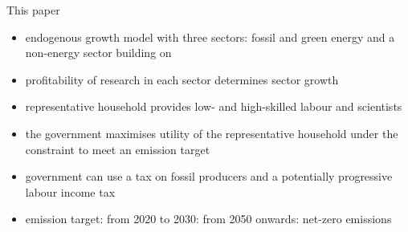 \documentclass[11pt,aspectratio=169]{beamer}
\newcommand{\ar}{$\Rightarrow$ \ }
\begin{document}

\begin{frame}{This paper}
\begin{itemize}
	\item<+-> endogenous growth model with three sectors: fossil and green energy and a non-energy sector building on \cite{Fried2018ClimateAnalysis}
	\item<+-> profitability of research in each sector determines sector growth
	\item<+-> representative household provides low- and high-skilled labour and scientists
	\item<+-> the government maximises utility of the representative household under the constraint to meet an emission target
	\item<+-> government can use a tax on fossil producers and a potentially progressive labour income tax
	\item<+-> emission target: from 2020 to 2030: from 2050 onwards: net-zero emissions
\end{itemize}
\end{frame}
\end{document}
